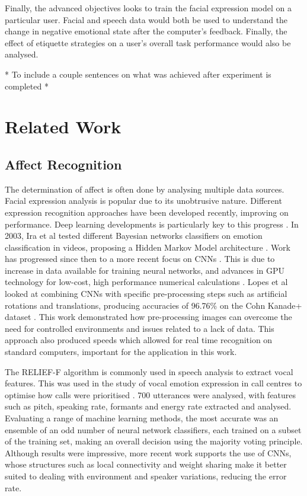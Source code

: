 \documentclass[12pt,a4paper]{article}
\begin{document}
Finally, the advanced objectives looks to train the facial expression model on a particular user. Facial and speech data would both be used to understand the change in negative emotional state after the computer's feedback. Finally, the effect of etiquette strategies on a user's overall task performance would also be analysed.

* To include a couple sentences on what was achieved after experiment is completed *



\section{Related Work}
\subsection{Affect Recognition}
The determination of affect is often done by analysing multiple data sources. Facial expression analysis is popular due to its unobtrusive nature. Different expression recognition approaches have been developed recently, improving on performance. Deep learning developments is particularly key to this progress \cite{voulodimos2018deep}. In 2003, Ira et al tested different Bayesian networks classifiers on emotion classification in videos, proposing a Hidden Markov Model architecture \cite{cohen2003evaluation}. Work has progressed since then to a more recent focus on CNNs \cite{cohen2003learning}. This is due to increase in data available for training neural networks, and advances in GPU technology for low-cost, high performance numerical calculations \cite{LOPES2017610}. Lopes et al looked at combining CNNs with specific pre-processing steps such as artificial rotations and translations, producing accuracies of 96.76\% on the Cohn Kanade+ dataset \cite{lucey2010extended}. This work demonstrated how pre-processing images can overcome the need for controlled environments and issues related to a lack of data. This approach also produced speeds which allowed for real time recognition on standard computers, important for the application in this work.

The RELIEF-F algorithm \cite{kononenko1994estimating} is commonly used in speech analysis to extract vocal features. This was used in the study of vocal emotion expression in call centres to optimise how calls were prioritised \cite{petrushin1999emotion}. 700 utterances were analysed, with features such as pitch, speaking rate, formants and energy rate extracted and analysed. Evaluating a range of machine learning methods, the most accurate was an ensemble of an odd number of neural network classifiers, each trained on a subset of the training set, making an overall decision using the majority voting principle. Although results were impressive, more recent work supports the use of CNNs, whose structures such as local connectivity and weight sharing make it better suited to dealing with environment and speaker variations, reducing the error rate.
\end{document}
